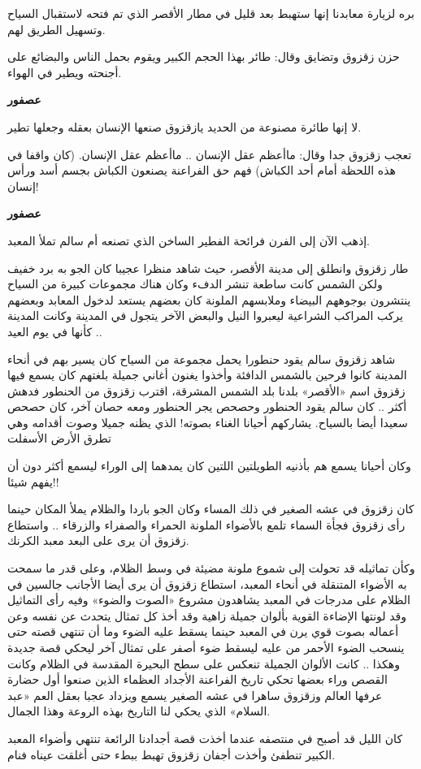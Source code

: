 \documentclass[12pt]{article}
\newlength{\SpeakerGutter}
\newlength{\DialogueGap}
\newlength{\StoryBodyWidth}
\newcommand{\Narration}[1]{%
  \par
  \noindent
  \begin{minipage}[t]{\StoryBodyWidth}
    \RaggedLeft
    #1
  \end{minipage}
  \par
}
\newcommand{\DialogueLine}[2]{%
  \par\addvspace{0.75\baselineskip}
  \noindent
  \begin{minipage}[t]{\SpeakerGutter}
    \RaggedLeft
    \bfseries #1
  \end{minipage}%
  \hspace{\DialogueGap}%
  \begin{minipage}[t]{\StoryBodyWidth}
    \RaggedLeft
    #2
  \end{minipage}%
  \par
}
\newcommand{\TextOnlyPage}[1]{%
  \clearpage
  \thispagestyle{empty}
  \vspace*{2mm}
  #1
  \clearpage
}
\begin{document}
\TextOnlyPage{%
  \Narration{بره لزيارة معابدنا إنها ستهبط بعد قليل في مطار الأقصر الذي تم فتحه لاستقبال السياح وتسهيل الطريق لهم.}
  \Narration{حزن زقزوق وتضايق وقال: طائر بهذا الحجم الكبير ويقوم بحمل الناس والبضائع على أجنحته ويطير في الهواء.}
  \DialogueLine{عصفور}{لا إنها طائرة مصنوعة من الحديد يازقزوق صنعها الإنسان بعقله وجعلها تطير.}
  \Narration{تعجب زقزوق جدا وقال: ماأعظم عقل الإنسان .. ماأعظم عقل الإنسان. (كان واقفا في هذه اللحظة أمام أحد الكباش) فهم حق الفراعنة يصنعون الكباش بجسم أسد ورأس إنسان!}
  \DialogueLine{عصفور}{إذهب الآن إلى الفرن فرائحة الفطير الساخن الذي تصنعه أم سالم تملأ المعبد.}
  \Narration{طار زقزوق وانطلق إلى مدينة الأقصر، حيث شاهد منظرا عجيبا كان الجو به برد خفيف ولكن الشمس كانت ساطعة تنشر الدفء وكان هناك مجموعات كبيرة من السياح ينتشرون بوجوههم البيضاء وملابسهم الملونة كان بعضهم يستعد لدخول المعابد وبعضهم يركب المراكب الشراعية ليعبروا النيل والبعض الآخر يتجول في المدينة وكانت المدينة كأنها في يوم العيد ..}
  \Narration{شاهد زقزوق سالم يقود حنطورا يحمل مجموعة من السياح كان يسير بهم في أنحاء المدينة كانوا فرحين بالشمس الدافئة وأخذوا يغنون أغاني جميلة بلغتهم كان يسمع فيها زقزوق اسم «الأقصر» بلدنا بلد الشمس المشرقة، اقترب زقزوق من الحنطور فدهش أكثر .. كان سالم يقود الحنطور وحصحص يجر الحنطور ومعه حصان آخر، كان حصحص سعيدا أيضا بالسياح. يشاركهم أحيانا الغناء بصوته! الذي يظنه جميلا وصوت أقدامه وهي تطرق الأرض الأسفلت}
}

\TextOnlyPage{%
  وكان أحيانا يسمع هم بأذنيه الطويلتين اللتين كان يمدهما إلى الوراء ليسمع أكثر دون أن يفهم شيئا!!

  كان زقزوق في عشه الصغير في ذلك المساء وكان الجو باردا والظلام يملأ المكان حينما رأى زقزوق فجأة السماء تلمع بالأضواء الملونة الحمراء والصفراء والزرقاء .. واستطاع زقزوق أن يرى على البعد معبد الكرنك.

  وكأن تماثيله قد تحولت إلى شموع ملونة مضيئة في وسط الظلام، وعلى قدر ما سمحت به الأضواء المتنقلة في أنحاء المعبد، استطاع زقزوق أن يرى أيضا الأجانب جالسين في الظلام على مدرجات في المعبد يشاهدون مشروع «الصوت والضوء» وفيه رأى التماثيل وقد لونتها الإضاءة القوية بألوان جميلة زاهية وقد أخذ كل تمثال يتحدث عن نفسه وعن أعماله بصوت قوي يرن في المعبد حينما يسقط عليه الضوء وما أن تنتهي قصته حتى ينسحب الضوء الأحمر من عليه ليسقط ضوء أصفر على تمثال آخر ليحكي قصة جديدة وهكذا .. كانت الألوان الجميلة تنعكس على سطح البحيرة المقدسة في الظلام وكانت القصص وراء بعضها تحكي تاريخ الفراعنة الأجداد العظماء الذين صنعوا أول حضارة عرفها العالم وزقزوق ساهرا في عشه الصغير يسمع ويزداد عجبا بعقل العم «عبد السلام» الذي يحكي لنا التاريخ بهذه الروعة وهذا الجمال.

  كان الليل قد أصبح في منتصفه عندما أخذت قصة أجدادنا الرائعة تنتهي وأضواء المعبد الكبير تنطفئ وأخذت أجفان زقزوق تهبط ببطء حتى أغلقت عيناه فنام.
}
\end{document}
